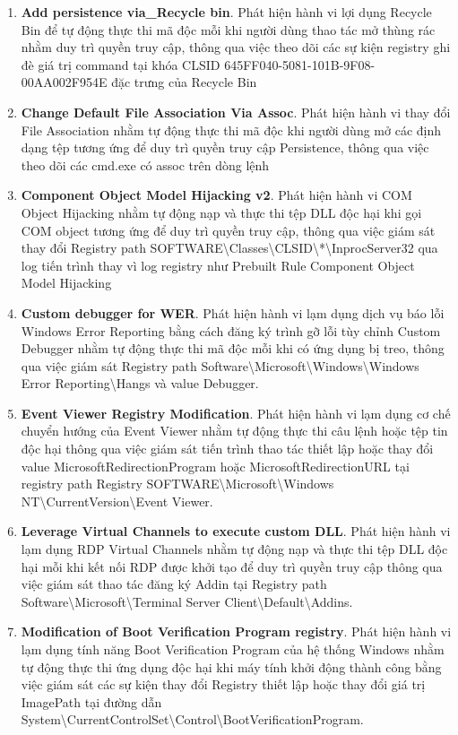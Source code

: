 \begin{enumerate}
\item \textbf{Add persistence via\_Recycle bin}. Phát hiện hành vi lợi dụng Recycle Bin để tự động thực thi mã độc mỗi khi người dùng thao tác mở thùng rác nhằm duy trì quyền truy cập, thông qua việc theo dõi các sự kiện registry ghi đè giá trị command tại khóa CLSID 645FF040-5081-101B-9F08-00AA002F954E đặc trưng của Recycle Bin
\item \textbf{Change Default File Association Via Assoc}. Phát hiện hành vi thay đổi File Association nhằm tự động thực thi mã độc khi người dùng mở các định dạng tệp tương ứng để duy trì quyền truy cập Persistence, thông qua việc theo dõi các cmd.exe có assoc trên dòng lệnh
\item \textbf{Component Object Model Hijacking v2}. Phát hiện hành vi COM Object Hijacking nhằm tự động nạp và thực thi tệp DLL độc hại khi gọi COM object tương ứng để duy trì quyền truy cập, thông qua việc giám sát thay đổi Registry path SOFTWARE\textbackslash{}Classes\textbackslash{}CLSID\textbackslash{}*\textbackslash{}InprocServer32 qua log tiến trình thay vì log registry như Prebuilt Rule Component Object Model Hijacking
\item \textbf{Custom debugger for WER}. Phát hiện hành vi lạm dụng dịch vụ báo lỗi Windows Error Reporting bằng cách đăng ký trình gỡ lỗi tùy chỉnh Custom Debugger nhằm tự động thực thi mã độc mỗi khi có ứng dụng bị treo, thông qua việc giám sát Registry path Software\textbackslash{}Microsoft\textbackslash{}Windows\textbackslash{}Windows Error Reporting\textbackslash{}Hangs và value Debugger.
\item \textbf{Event Viewer Registry Modification}. Phát hiện hành vi lạm dụng cơ chế chuyển hướng của Event Viewer nhằm tự động thực thi câu lệnh hoặc tệp tin độc hại thông qua việc giám sát tiến trình thao tác thiết lập hoặc thay đổi value MicrosoftRedirectionProgram hoặc MicrosoftRedirectionURL tại registry path Registry SOFTWARE\textbackslash{}Microsoft\textbackslash{}Windows NT\textbackslash{}CurrentVersion\textbackslash{}Event Viewer.
\item \textbf{Leverage Virtual Channels to execute custom DLL}. Phát hiện hành vi lạm dụng RDP Virtual Channels nhằm tự động nạp và thực thi tệp DLL độc hại mỗi khi kết nối RDP được khởi tạo để duy trì quyền truy cập thông qua việc giám sát thao tác đăng ký Addin tại Registry path Software\textbackslash{}Microsoft\textbackslash{}Terminal Server Client\textbackslash{}Default\textbackslash{}Addins.
\item \textbf{Modification of Boot Verification Program registry}. Phát hiện hành vi lạm dụng tính năng Boot Verification Program của hệ thống Windows nhằm tự động thực thi ứng dụng độc hại khi máy tính khởi động thành công bằng việc giám sát các sự kiện thay đổi Registry thiết lập hoặc thay đổi giá trị ImagePath tại đường dẫn System\textbackslash{}CurrentControlSet\textbackslash{}Control\textbackslash{}BootVerificationProgram.

\end{enumerate}
